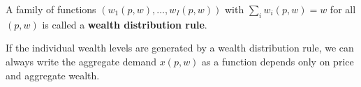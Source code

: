 \documentclass{article}
\begin{document}
	 		\begin{definition}
	 			A family of functions $(w_1(p, w), \dots, w_I(p, w))$ with $\sum_i w_i(p, w) = w$ for all $(p, w)$ is called a \textbf{wealth distribution rule}.
	 		\end{definition}
	 		
	 		\begin{proposition}
	 			If the individual wealth levels are generated by a wealth distribution rule, we can always write the aggregate demand $x(p, w)$ as a function depends only on price and aggregate wealth.
	 		\end{proposition}
\end{document}

